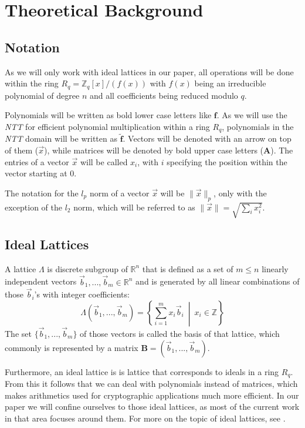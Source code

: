 %
%

\chapter{Theoretical Background}

\section{Notation}
As we will only work with ideal lattices in our paper, all operations will be done within the ring \(R_q=\mathbb{Z}_q[x]/(f(x))\) with \(f(x)\) being an irreducible polynomial of degree \(n\) and all coefficients being reduced modulo \(q\).

Polynomials will be written as bold lower case letters like \(\textbf{f}\). As we will use the \textit{\ac{NTT}} for efficient polynomial multiplication within a ring \(R_q\), polynomials in the \textit{\ac{NTT}} domain will be written as \(\tilde{\textbf{f}}\). Vectors will be denoted with an arrow on top of them (\(\vec{x}\)), while matrices will be denoted by bold upper case letters (\(\textbf{A}\)). The entries of a vector \(\vec{x}\) will be called \(x_i\), with \(i\) specifying the position within the vector starting at 0.

The notation for the \(l_p\) norm of a vector \(\vec{x}\) will be \(\|\vec{x}\|_p\), only with the exception of the \(l_2\) norm, which will be referred to as \(\|\vec{x}\|=\sqrt{\sum_{i} x_i^2}\).

\section{Ideal Lattices}
A lattice \(\Lambda\) is discrete subgroup of \(\mathbb{R}^n\) that is defined as a set of \(m \leq n\) linearly independent vectors \(\vec{b}_1,...,\vec{b}_m \in \mathbb{R}^n\) and is generated by all linear combinations of those \(\vec{b}_i\)'s with integer coefficients:
\begin{equation}
	\Lambda(\vec{b}_1,...,\vec{b}_m)=\left \{ \displaystyle \sum_{i=1}^{m} x_i \vec{b}_i \: \middle | \: x_i \in \mathbb{Z} \right \}
\end{equation}
The set \(\{\vec{b}_1,...,\vec{b}_m\}\) of those vectors is called the basis of that lattice, which commonly is represented by a matrix \(\textbf{B}=(\vec{b}_1,...,\vec{b}_m)\).

Furthermore, an ideal lattice is is lattice that corresponds to ideals in a ring \(R_q\). From this it follows that we can deal with polynomials instead of matrices, which makes arithmetics used for cryptographic applications much more efficient. In our paper we will confine ourselves to those ideal lattices, as most of the current work in that area focuses around them. For more on the topic of ideal lattices, see \cite{cryptoeprint:2012:230}.

